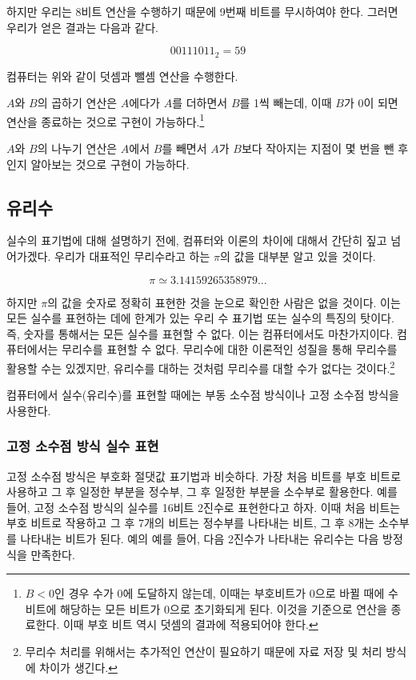 \documentclass{article}
\begin{document}
하지만 우리는 8비트 연산을 수행하기 때문에 9번째 비트를 무시하여야 한다.
그러면 우리가 얻은 결과는 다음과 같다.

$$
00111011_2 = 59
$$

컴퓨터는 위와 같이 덧셈과 뺄셈 연산을 수행한다.

$A$와 $B$의 곱하기 연산은 $A$에다가 $A$를 더하면서 $B$를 1씩 빼는데,
이때 $B$가 0이 되면 연산을
종료하는 것으로 구현이 가능하다.\footnote{$B < 0$인 경우 수가 0에 도달하지 않는데, 이때는
부호비트가 0으로 바뀔 때에 수 비트에 해당하는 모든 비트가 0으로 초기화되게 된다. 이것을 기준으로
연산을 종료한다. 이때 부호 비트 역시 덧셈의 결과에 적용되어야 한다.}

$A$와 $B$의 나누기 연산은 $A$에서 $B$를 빼면서 $A$가 $B$보다 작아지는 지점이 몇 번을 뺀
후인지 알아보는 것으로 구현이 가능하다.

\subsection{유리수}

실수의 표기법에 대해 설명하기 전에, 컴퓨터와 이론의 차이에 대해서 간단히 짚고 넘어가겠다.
우리가 대표적인 무리수라고 하는 $\pi$의 값을 대부분 알고 있을 것이다.

$$
\pi \simeq 3.14159265358979 \dots
$$

하지만 $\pi$의 값을 숫자로 정확히 표현한 것을 눈으로 확인한 사람은 없을 것이다.
이는 모든 실수를 표현하는 데에 한계가 있는 우리 수 표기법 또는 실수의 특징의 탓이다.
즉, 숫자를 통해서는 모든 실수를 표현할 수 없다. 이는 컴퓨터에서도 마찬가지이다.
컴퓨터에서는 무리수를 표현할 수 없다. 무리수에 대한 이론적인 성질을 통해 무리수를 활용할 수는
있겠지만, 유리수를 대하는 것처럼 무리수를 대할 수가 없다는 것이다.\footnote{무리수 처리를
위해서는 추가적인 연산이 필요하기 때문에 자료 저장 및 처리 방식에 차이가 생긴다.}

컴퓨터에서 실수(유리수)를 표현할 때에는 부동 소수점 방식이나 고정 소수점 방식을 사용한다.

\subsubsection{고정 소수점 방식 실수 표현}

고정 소수점 방식은 부호화 절댓값 표기법과 비슷하다. 가장 처음 비트를 부호 비트로 사용하고
그 후 일정한 부분을 정수부, 그 후 일정한 부분을 소수부로 활용한다.
예를 들어, 고정 소수점 방식의 실수를 16비트 2진수로 표현한다고 하자.
이때 처음 비트는 부호 비트로 작용하고 그 후 7개의 비트는 정수부를 나타내는 비트,
그 후 8개는 소수부를 나타내는 비트가 된다.
예의 예를 들어, 다음 2진수가 나타내는 유리수는 다음 방정식을 만족한다.
\end{document}
